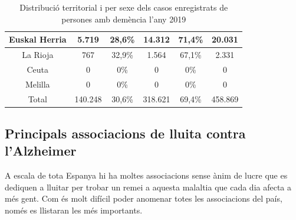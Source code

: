 \documentclass[a4paper,12pt]{article}
\begin{document}
\begin{table}[h]
\begin{tabular}{ |c | c | c | c | c | c | }
         \hline
        Euskal Herria & 5.719 & 28,6\% & 14.312 & 71,4\% & 20.031\\
         \hline
        La Rioja & 767 & 32,9\% & 1.564 & 67,1\% & 2.331\\
         \hline
        Ceuta & 0 & 0\% & 0 & 0\% & 0\\
        \hline
        Melilla & 0 & 0\% & 0 & 0\% & 0\\
        \hline
        Total & 140.248 & 30,6\% & 318.621 & 69,4\% & 458.869\\
        \hline
    \end{tabular}
    \caption{Distribució territorial i per sexe dels casos enregistrats de persones amb demència l'any 2019}
    \label{tab:taula2}
\end{table}
\newpage
\subsection*{Principals associacions de lluita contra l'Alzheimer}
A escala de tota Espanya hi ha moltes associacions sense ànim de lucre que es dediquen a lluitar per trobar un remei a aquesta malaltia que cada dia afecta a més gent. Com és molt difícil poder anomenar totes les associacions del país, només es llistaran les més importants.
\end{document}
